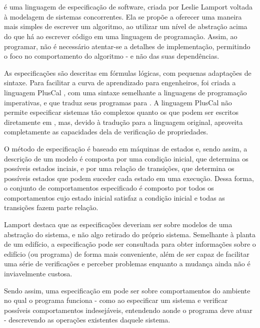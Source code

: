 \chapter{\TLA}
\label{cap2}

\TLA é uma linguagem de especificação de software, criada por Leslie Lamport \cite{tlahistory} voltada à modelagem de sistemas concorrentes. Ela se propõe a oferecer uma maneira mais simples de escrever um algoritmo, ao utilizar um nível de abstração acima do que há ao escrever código em uma linguagem de programação. Assim, ao programar, não é necessário atentar-se a detalhes de implementação, permitindo o foco no comportamento do algoritmo - e não das suas dependências.

As especificações são descritas em fórmulas lógicas, com pequenas adaptações de sintaxe. Para facilitar a curva de aprendizado para engenheiros, foi criada a linguagem PlusCal \cite{pluscal}, com uma sintaxe semelhante a linguagens de programação imperativas, e que traduz seus programas para \TLA. A linguagem PlusCal não permite especificar sistemas tão complexos quanto os que podem ser escritos diretamente em \TLA, mas, devido à tradução para a linguagem original, aproveita completamente as capacidades dela de verificação de propriedades.

O método de especificação é baseado em máquinas de estados \cite{tlahistory} e, sendo assim, a descrição de um modelo é composta por uma condição inicial, que determina os possíveis estados inciais, e por uma relação de transições, que determina os possíveis estados que podem suceder cada estado em uma execução. Dessa forma, o conjunto de comportamentos especificado é composto por todos os comportamentos cujo estado inicial satisfaz a condição inicial e todas as transições fazem parte relação.

Lamport destaca \cite{hyperbook} que as especificações deveriam ser sobre modelos de uma abstração do sistema, e não algo retirado do próprio sistema. Semelhante à planta de um edifício, a especificação pode ser consultada para obter informações sobre o edifício (ou programa) de forma mais conveniente, além de ser capaz de facilitar uma série de verificações e perceber problemas enquanto a mudança ainda não é inviavelmente custosa.

Sendo assim, uma especificação em \TLA pode ser sobre comportamentos do ambiente no qual o programa funciona - como ao especificar um sistema e verificar possíveis comportamentos indesejáveis, entendendo aonde o programa deve atuar - des\-crevendo as operações existentes daquele sistema.

